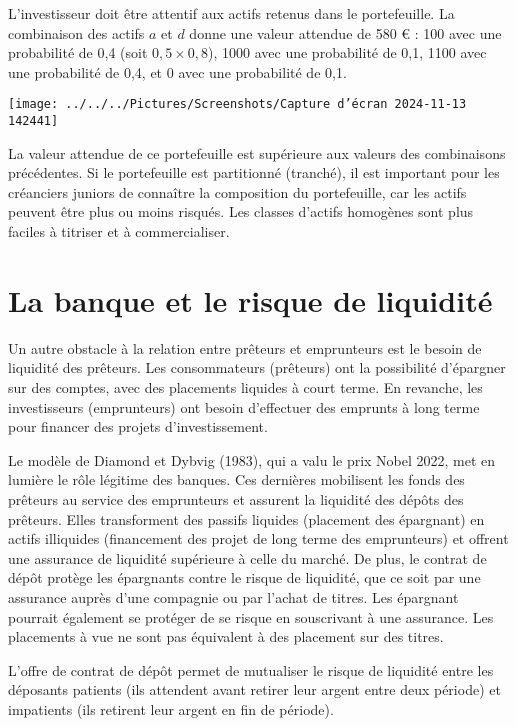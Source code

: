 \documentclass[a4paper, 12pt]{report}
\begin{document}
L'investisseur doit être attentif aux actifs retenus dans le portefeuille. La combinaison des actifs \( a \) et \( d \) donne une valeur attendue de 580 € : 100 avec une probabilité de 0,4 (soit \( 0,5 \times 0,8 \)), 1000 avec une probabilité de 0,1, 1100 avec une probabilité de 0,4, et 0 avec une probabilité de 0,1.

\begin{center}
	\texttt{[image: ../../../Pictures/Screenshots/Capture d'écran 2024-11-13 142441]}
\end{center}

La valeur attendue de ce portefeuille est supérieure aux valeurs des combinaisons précédentes. Si le portefeuille est partitionné (tranché), il est important pour les créanciers juniors de connaître la composition du portefeuille, car les actifs peuvent être plus ou moins risqués. Les classes d’actifs homogènes sont plus faciles à titriser et à commercialiser.

\chapter{La banque et le risque de liquidité}

Un autre obstacle à la relation entre prêteurs et emprunteurs est le besoin de liquidité des prêteurs. Les consommateurs (prêteurs) ont la possibilité d’épargner sur des comptes, avec des placements liquides à court terme. En revanche, les investisseurs (emprunteurs) ont besoin d’effectuer des emprunts à long terme pour financer des projets d'investissement.

Le modèle de Diamond et Dybvig (1983), qui a valu le prix Nobel 2022, met en lumière le rôle légitime des banques. Ces dernières mobilisent les fonds des prêteurs au service des emprunteurs et assurent la liquidité des dépôts des prêteurs. Elles transforment des passifs liquides (placement des épargnant) en actifs illiquides (financement des projet de long terme des emprunteurs) et offrent une assurance de liquidité supérieure à celle du marché. De plus, le contrat de dépôt protège les épargnants contre le risque de liquidité, que ce soit par une assurance auprès d'une compagnie ou par l'achat de titres. Les épargnant pourrait également se protéger de se risque en souscrivant à une assurance. Les placements à vue ne sont pas équivalent à des placement sur des titres.

L'offre de contrat de dépôt permet de mutualiser le risque de liquidité entre les déposants patients (ils attendent avant retirer leur argent entre deux période) et impatients  (ils retirent leur argent en fin de période). 
\end{document}
